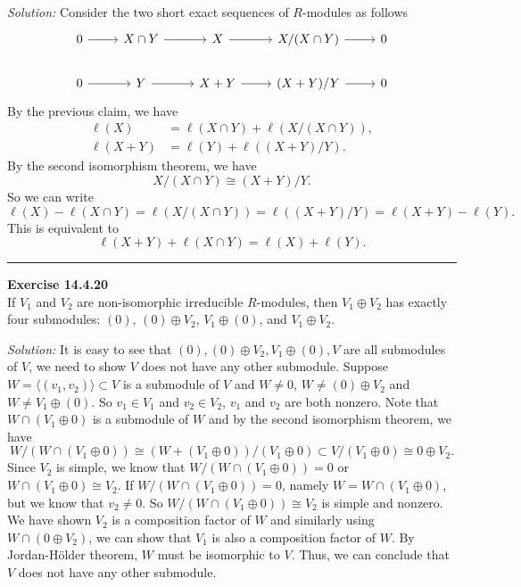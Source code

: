 \documentclass[a4paper, 12pt]{article}
\newenvironment{problem}[2][Exercise]
    { \begin{mdframed}[backgroundcolor=gray!20] \textbf{#1 #2} \\}
    {  \end{mdframed}}
\newenvironment{solution}
    {\textit{Solution:}}
    {}
\newcommand{\la}{\langle}
\newcommand{\ra}{\rangle}
\begin{document}
\begin{solution}
Consider the two short exact sequences of \(R\)-modules as follows 
\[\begin{tikzcd}
	0 & {X\cap Y} & X & {X/(X\cap Y)} & 0 \\
	0 & Y & {X+Y} & {(X+Y)/Y} & 0
	\arrow[from=1-1, to=1-2]
	\arrow[from=1-2, to=1-3]
	\arrow[from=1-3, to=1-4]
	\arrow[from=1-4, to=1-5]
	\arrow[from=2-1, to=2-2]
	\arrow[from=2-2, to=2-3]
	\arrow[from=2-3, to=2-4]
	\arrow[from=2-4, to=2-5]
\end{tikzcd}\]
By the previous claim, we have 
\begin{align*}
    \ell(X)&=\ell(X\cap Y)+\ell(X/(X\cap Y)),\\ 
    \ell(X+Y)&=\ell(Y)+\ell((X+Y)/Y).
\end{align*}
By the second isomorphism theorem, we have 
\[X/(X\cap Y)\cong (X+Y)/Y.\]
So we can write 
\[\ell(X)-\ell(X\cap Y)=\ell(X/(X\cap Y))=\ell((X+Y)/Y)=\ell(X+Y)-\ell(Y).\]
This is equivalent to 
\[\ell(X+Y)+\ell(X\cap Y)=\ell(X)+\ell(Y).\]
\end{solution}

\noindent\rule{7in}{2.8pt}
\begin{problem}{14.4.20}
If \(V_1\) and \(V_2\) are non-isomorphic irreducible \(R\)-modules, then \(V_1\oplus V_2\) has exactly four submodules: \((0)\), \((0)\oplus V_2\), \(V_1\oplus (0)\), and \(V_1\oplus V_2\). 
\end{problem}
\begin{solution}
It is easy to see that \((0),(0)\oplus V_2,V_1\oplus (0),V\) are all submodules of \(V\), we need to show \(V\) does not have any other submodule. Suppose \(W=\la (v_1,v_2)\ra\subset V\) is a submodule of \(V\) and \(W\neq 0\), \(W\neq (0)\oplus V_2\) and \(W\neq V_1\oplus (0)\).  
So \(v_1\in V_1\) and \(v_2\in V_2\), \(v_1\) and \(v_2\) are both nonzero. Note that \(W\cap (V_1\oplus 0)\) is a submodule of \(W\) and by the second isomorphism theorem, we have 
\[W/(W\cap (V_1\oplus 0))\cong (W+(V_1\oplus 0))/(V_1\oplus 0)\subset V/(V_1\oplus 0)\cong 0\oplus V_2.\]
Since \(V_2\) is simple, we know that \(W/(W\cap (V_1\oplus 0))=0\) or \(W\cap (V_1\oplus 0)\cong V_2\). If \(W/(W\cap (V_1\oplus 0))=0\), namely \(W=W\cap (V_1\oplus 0)\), but we know that \(v_2\neq 0\). So 
\(W/(W\cap (V_1\oplus 0))\cong V_2\) is simple and nonzero. We have shown \(V_2\) is a composition factor of \(W\) and similarly using \(W\cap (0\oplus V_2)\), we can show that \(V_1\) is also a composition factor of 
\(W\). By Jordan-H\"{o}lder theorem, \(W\) must be isomorphic to \(V\). Thus, we can conclude that \(V\) does not have any other submodule.
\end{solution}
\end{document}
